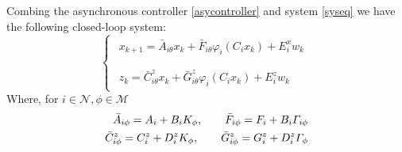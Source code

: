 \documentclass[conference]{IEEEtran}
\begin{document}
Combing the asynchronous controller \eqref{asycontroller} and system \eqref{syseq} we have the following closed-loop system:
\begin{equation}\label{close_system_equation_2}
\left\{
\begin{array}{lr}
\begin{split}
x_{k+1}=\bar{A}_{i\theta}x_k+\bar{F}_{i\theta}\varphi_{i}(C_ix_k)+E_i^xw_k\\
\end{split}
\\
\begin{split}
z_k=\bar{C}^{z}_{i\theta}x_k+\bar{G}^{z}_{i\theta}\varphi_{i}(C_ix_k)+E^z_iw_k
\end{split}
\end{array}
\right.
\end{equation} 
Where, for $i \in \mathcal{N}, \phi \in \mathcal{M}$
\begin{equation} \notag
\begin{aligned}
\bar{A}_{i\phi}=A_{i}+B_{i}K_{\phi},  \qquad \bar{F}_{i\phi}=F_{i}+B_{i}\varGamma_{i\phi} \\
\bar{C}^{z}_{i\phi}=C^{z}_{i}+D^{z}_{i}K_{\phi}, \qquad \bar{G}^{z}_{i\phi}=G^{z}_{i}+D^{z}_{i}\varGamma_{\phi}
\end{aligned}
\end{equation}
\end{document}
